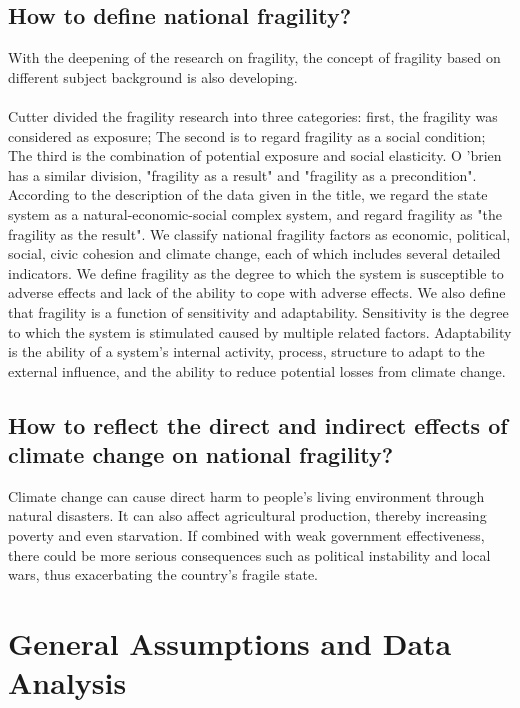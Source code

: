 \documentclass{mcmthesis}
\newcommand{\upcite}[1]{\textsuperscript{\textsuperscript{\cite{#1}}}}
\begin{document}
\subsection{How to define national fragility?}
With the deepening of the research on fragility, the concept of fragility 
based on different subject background is also developing.\\\\
Cutter divided the fragility research into three categories: first, the 
fragility was considered as exposure; The second is to regard fragility 
as a social condition; The third is the combination of potential exposure 
and social elasticity.\upcite{bib18} O 'brien has a similar division, "fragility 
as a result" and "fragility as a precondition".\upcite{bib19} According to the 
description of the data given in the title, we regard the state system as a 
natural-economic-social complex system, and regard fragility as "the fragility 
as the result". We classify national fragility factors as economic, political, 
social, civic cohesion and climate change, each of which includes several detailed 
indicators. We define fragility as the degree to which the system is susceptible 
to adverse effects and lack of the ability to cope with adverse effects. We also 
define that fragility is a function of sensitivity and adaptability. 
Sensitivity is the degree to which the system is stimulated caused by multiple 
related factors. Adaptability is the ability of a system's internal activity, 
process, structure to adapt to the external influence, and the ability to reduce 
potential losses from climate change.
\subsection{How to reflect the direct and indirect effects of climate change on national fragility?}
Climate change can cause direct harm to people's living environment through natural 
disasters. It can also affect agricultural production, thereby increasing 
poverty and even starvation. If combined with weak government effectiveness, 
there could be more serious consequences such as political instability and 
local wars, thus exacerbating the country's fragile state.
\section{General Assumptions and Data Analysis}
\end{document}
